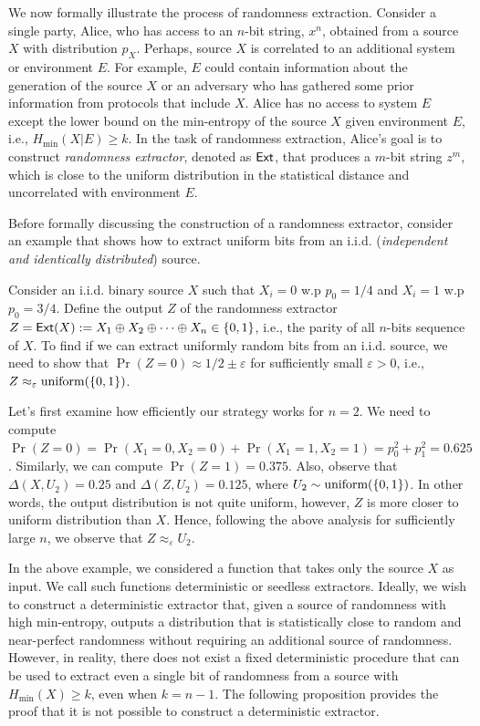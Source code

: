 We now formally illustrate the process of randomness extraction. Consider a single party, Alice, who has access to an $n$-bit string, $x^n$, obtained from a source $X$ with distribution $p_{X}$. Perhaps, source $X$ is correlated to an additional
system or environment $E$. For example, $E$ could contain information about the generation of the source $X$ or an adversary who has gathered some prior information from protocols that include $X$. Alice has no access to system $E$ except the lower bound on the min-entropy of the source $X$ given environment $E$, i.e., $H_{\min}(X|E) \geq k$. In the task of randomness extraction, Alice’s goal is to construct \textit{randomness extractor}, denoted as $\mathsf{Ext}$, that produces a
$m$-bit string $z^m$, which is close to the uniform distribution in the statistical distance and uncorrelated with environment $E$.

Before formally discussing the construction of a randomness extractor, consider an example that shows how to extract uniform bits from an i.i.d. (\textit{independent and identically distributed}) source.

\begin{example}Consider an i.i.d. binary source $X$ such that $X_i = 0$ w.p $p_0 = 1/4$ and $X_i = 1$ w.p $p_0 = 3/4$. Define the output $Z$ of the randomness extractor $Z = \mathsf{Ext}(X) := X_1\oplus X_2\oplus \cdots \oplus X_n \in \{0,1\}$, i.e., the parity of all $n$-bits sequence of $X$. To find if we can extract uniformly random bits from an i.i.d. source, we need to show that $\Pr(Z=0) \approx 1/2 \pm \varepsilon$ for sufficiently small $\varepsilon > 0$, i.e., $Z \approx_{\varepsilon} \text{uniform}(\{0,1\})$.

Let's first examine how efficiently our strategy works for $n=2$. We need to compute
    $\Pr(Z=0) = \Pr(X_1 = 0, X_2 = 0) + \Pr(X_1 = 1, X_2 = 1) = p_0^2+p_1^2 = 0.625$. Similarly, we can compute $\Pr(Z=1) = 0.375$. Also, observe that $\Delta(X,U_2) = 0.25$ and $\Delta(Z,U_2) = 0.125$, where $U_2 \sim \text{uniform}(\{0,1\})$. In other words, the output distribution is not quite uniform, however, $Z$ is more closer to uniform distribution than $X$. Hence, following the above analysis for sufficiently large $n$, we observe that $Z \approx_\varepsilon U_2$.

\end{example}

In the above example, we considered a function that takes only the source $X$ as input. We call such functions deterministic or seedless extractors. Ideally, we wish to construct a deterministic extractor that, given a source of randomness with high min-entropy, outputs a distribution that is statistically close to random and near-perfect randomness without requiring an additional source of randomness.  However, in reality, there does not exist a fixed deterministic
procedure that can be used to extract even a single bit of randomness from a source with $H_{\min}(X) \geq k$,
even when $k = n - 1$. The following proposition provides the proof that it is not possible to construct a deterministic extractor.

